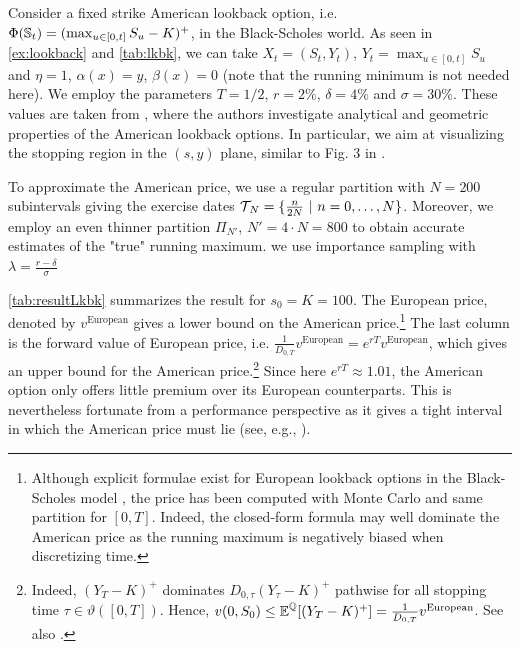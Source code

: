 Consider a fixed strike American lookback option, i.e.  $\Phi(\operatorname{\mathbb{S}}_t) = (\max_{u\in[0,t]} S_u - K)^+$,  in the Black-Scholes world.  %
As seen in \cref{ex:lookback} and \cref{tab:lkbk}, we can take $X_t = (S_t,Y_t)$, $Y_t = \max_{u\in[0,t]} S_u$  and $\eta=1$, $\alpha(x) = y$, $\beta(x) = 0$ (note that the running minimum is not needed here). 
We employ the parameters $T=1/2$,   $r=2\%$, $\delta =4\%$ and $\sigma = 30 \%$. 
These values are taken from  \citet{DaiKwok}, where the authors investigate analytical and geometric properties of the American lookback options. In particular, we aim at visualizing the stopping region in the $(s,y)$ plane, similar to Fig. $3$ in \cite{DaiKwok}.   %

To approximate the American price, we use a regular partition  with $N=200$ subintervals giving the exercise dates $\calT_{\!N} = \{\frac{n}{2N} \ | \ n=0,\ldots,N\}$.  Moreover, we employ an even thinner  partition $\Pi_{N'}$, $N'=4\cdot N = 800$ to obtain accurate estimates of  the "true" running maximum. we use importance sampling with $\lambda = \frac{r-\delta}{\sigma}$

\cref{tab:resultLkbk} summarizes the result for $s_0=K=100$. The European price, denoted by $v^{\text{European}}$ gives a lower bound on the American price.\footnote{Although explicit formulae exist for European lookback options in the Black-Scholes model \cite{Conze}, the price has been computed with Monte Carlo and same  partition for $[0,T]$. Indeed, the closed-form formula may well dominate the American price as the running maximum is negatively biased when  discretizing time. }   
The  last  column is the  forward value of European price, i.e.  $\frac{1}{D_{0,T}}v^{\text{European}} = e^{rT}v^{\text{European}}$, which  gives an upper bound for the American price.\footnote{Indeed, $(Y_{T}-K)^{+}$ dominates  $D_{0,\tau}(Y_{\tau}-K)^{+}$ pathwise for all stopping time $\tau \in \vartheta([0,T])$. Hence, $ v(0,S_0) \le \operatorname{\mathbb{E}}^{\operatorname{\mathbb{Q}}}[(Y_{T}-K)^{+}] = \frac{1}{D_{0,T}}v^{\text{European}}$. See also \citet{Conze}. } Since here $e^{rT} \approx 1.01$, the American option only offers little premium over its European counterparts. This is nevertheless  fortunate from a performance perspective as it gives a tight interval in which the American price must lie (see, e.g., \cite{Conze}).  




